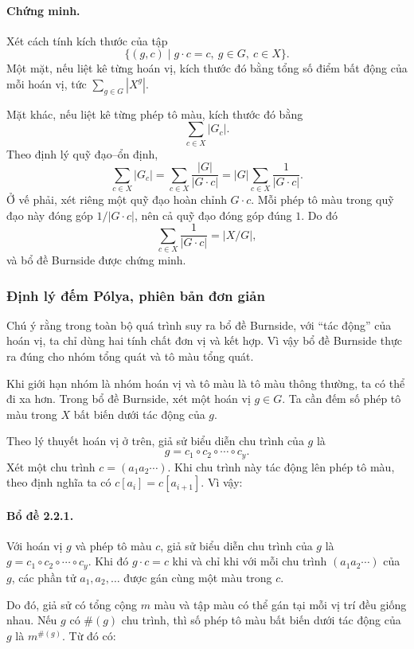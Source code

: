 \documentclass[11pt]{article}
\begin{document}
\paragraph{Chứng minh.}
Xét cách tính kích thước của tập
\[
  \{(g,c)\mid g\cdot c=c,\ g\in G,\ c\in X\}.
\]
Một mặt, nếu liệt kê từng hoán vị, kích thước đó bằng tổng số điểm bất động của
mỗi hoán vị, tức \(\sum_{g\in G}|X^g|\).

Mặt khác, nếu liệt kê từng phép tô màu, kích thước đó bằng
\[
  \sum_{c\in X}|G_c|.
\]
Theo định lý quỹ đạo--ổn định,
\[
  \sum_{c\in X}|G_c|
  =\sum_{c\in X}\frac{|G|}{|G\cdot c|}
  =|G|\sum_{c\in X}\frac{1}{|G\cdot c|}.
\]
Ở vế phải, xét riêng một quỹ đạo hoàn chỉnh \(G\cdot c\). Mỗi phép tô màu trong
quỹ đạo này đóng góp \(1/|G\cdot c|\), nên cả quỹ đạo đóng góp đúng \(1\).
Do đó
\[
  \sum_{c\in X}\frac{1}{|G\cdot c|}=|X/G|,
\]
và bổ đề Burnside được chứng minh.

\subsubsection{Định lý đếm Pólya, phiên bản đơn giản}

Chú ý rằng trong toàn bộ quá trình suy ra bổ đề Burnside, với ``tác động'' của
hoán vị, ta chỉ dùng hai tính chất đơn vị và kết hợp. Vì vậy bổ đề Burnside
thực ra đúng cho nhóm tổng quát và tô màu tổng quát.

Khi giới hạn nhóm là nhóm hoán vị và tô màu là tô màu thông thường, ta có thể
đi xa hơn. Trong bổ đề Burnside, xét một hoán vị \(g\in G\). Ta cần đếm số
phép tô màu trong \(X\) bất biến dưới tác động của \(g\).

Theo lý thuyết hoán vị ở trên, giả sử biểu diễn chu trình của \(g\) là
\[
  g=c_1\circ c_2\circ\cdots\circ c_y.
\]
Xét một chu trình \(c=(a_1a_2\cdots)\). Khi chu trình này tác động lên phép tô
màu, theo định nghĩa ta có \(c[a_i]=c[a_{i+1}]\). Vì vậy:

\paragraph{Bổ đề 2.2.1.}
Với hoán vị \(g\) và phép tô màu \(c\), giả sử biểu diễn chu trình của \(g\) là
\(g=c_1\circ c_2\circ\cdots\circ c_y\). Khi đó \(g\cdot c=c\) khi và chỉ khi
với mỗi chu trình \((a_1a_2\cdots)\) của \(g\), các phần tử \(a_1,a_2,\ldots\)
được gán cùng một màu trong \(c\).

Do đó, giả sử có tổng cộng \(m\) màu và tập màu có thể gán tại mỗi vị trí đều
giống nhau. Nếu \(g\) có \(\#(g)\) chu trình, thì số phép tô màu bất biến dưới
tác động của \(g\) là \(m^{\#(g)}\). Từ đó có:
\end{document}
